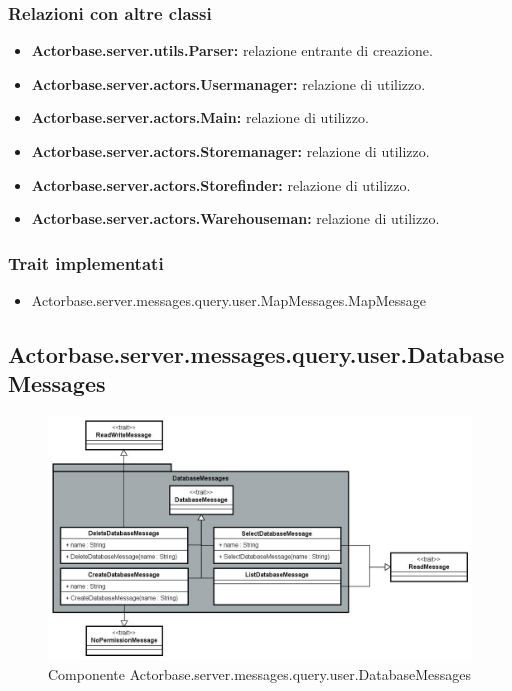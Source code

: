 \documentclass[a4paper]{article}
\begin{document}
			\subsubsection{Relazioni con altre classi}
				\begin{itemize}
					\item \textbf{Actorbase.server.utils.Parser:} relazione entrante di creazione.
					\item \textbf{Actorbase.server.actors.Usermanager:} relazione di utilizzo.
					\item \textbf{Actorbase.server.actors.Main:} relazione di utilizzo.
					\item \textbf{Actorbase.server.actors.Storemanager:} relazione di utilizzo.
					\item \textbf{Actorbase.server.actors.Storefinder:} relazione di utilizzo.
					\item \textbf{Actorbase.server.actors.Warehouseman:} relazione di utilizzo.
				\end{itemize}
			\subsubsection{Trait implementati}
				\begin{itemize}
					\item Actorbase.server.messages.query.user.MapMessages.MapMessage
				\end{itemize}
				
		\subsection{Actorbase.server.messages.query.user.DatabaseMessages}
		
			\begin{figure}[H]
				\centering
				\includegraphics[scale=0.70]{ST/Server/databaseMessagesLevel}
				\caption{Componente Actorbase.server.messages.query.user.DatabaseMessages}
			\end{figure}
			
\end{document}
